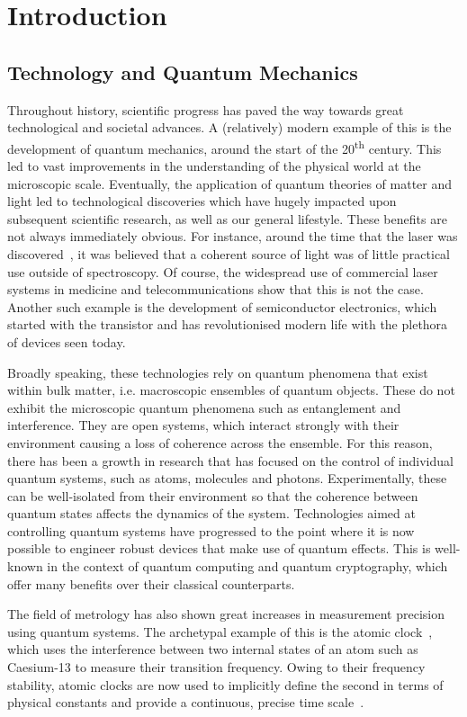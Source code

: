 \chapter{Introduction}\label{chap:intro}
\section{Technology and Quantum Mechanics}
Throughout history, scientific progress has paved
the way towards great technological and societal advances. A
(relatively) modern
example of this is the development of quantum mechanics,
around the start of the 20\textsuperscript{th} century. This led to
vast improvements in the understanding of the physical world at the
microscopic scale. Eventually, the application of quantum theories of
matter and light led
to technological discoveries which have hugely impacted upon
subsequent scientific research, as well as our general lifestyle. These benefits are not always immediately obvious. For
instance, around the time that the laser was
discovered~\cite{Schawlow1958}, it
was believed that a coherent source of light was of little practical
use
outside of spectroscopy. Of course, the widespread use of commercial laser systems in
medicine and telecommunications show that this is not the case.
Another such example is the development of semiconductor electronics, which started with the transistor and has revolutionised
modern life with the plethora of devices seen today. 
\par\noindent
Broadly speaking, these technologies rely on quantum phenomena that
exist within
bulk matter, i.e. macroscopic ensembles of quantum objects. 
These do not exhibit the microscopic quantum phenomena such as
entanglement and interference. They are open systems, which interact strongly with their
environment causing a loss of coherence across the ensemble. For
this reason, there has been a
growth in research that has focused on the control of
individual quantum systems, such as atoms, molecules and photons.
Experimentally, these can be well-isolated from their environment so
that the coherence between quantum states affects the dynamics of the
system. Technologies aimed at controlling quantum systems have
progressed to the point where it is now possible to engineer robust
devices that make use of quantum effects. This is well-known in the
context of quantum computing and quantum cryptography, which offer
many benefits over their classical counterparts. 
\par\noindent
The field of metrology has also shown great increases in measurement
precision using quantum systems. The archetypal example of this is the
atomic clock~\cite{ESSEN1955}, which uses the interference between two internal states
of an atom such as Caesium-13 to
measure their transition frequency. Owing to their frequency
stability, atomic clocks are now used to implicitly define the
second in terms of physical constants and provide a continuous,
precise time scale~\cite{Levine}.

